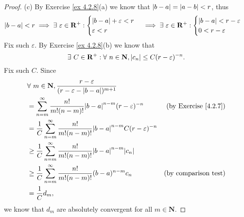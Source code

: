 \begin{proof}{(c)}
    By Exercise \ref{ex 4.2.8}(a) we know that \(\abs*{b - a} = \abs*{a - b} < r\), thus
    \[
        \abs*{b - a} < r \implies \exists\ \varepsilon \in \mathbf{R}^+ : \begin{cases}
            \abs*{b - a} + \varepsilon < r \\
            \varepsilon < r
        \end{cases} \implies \exists\ \varepsilon \in \mathbf{R}^+ : \begin{cases}
            \abs*{b - a} < r - \varepsilon \\
            0 < r - \varepsilon
        \end{cases}
    \]
    Fix such \(\varepsilon\).
    By Exercise \ref{ex 4.2.8}(b) we know that
    \[
        \exists\ C \in \mathbf{R}^+ : \forall\ n \in \mathbf{N}, \abs*{c_n} \leq C (r - \varepsilon)^{-n}.
    \]
    Fix such \(C\).
    Since
    \begin{align*}
         & \forall\ m \in \mathbf{N}, \frac{r - \varepsilon}{(r - \varepsilon - \abs*{b - a})^{m + 1}}                                               \\
         & = \sum_{n = m}^\infty \frac{n!}{m! (n - m)!} \abs*{b - a}^{n - m} (r - \varepsilon)^{-n}               & \text{(by Exercise \ref{4.2.7})} \\
         & = \frac{1}{C} \sum_{n = m}^\infty \frac{n!}{m! (n - m)!} \abs*{b - a}^{n - m} C (r - \varepsilon)^{-n}                                    \\
         & \geq \frac{1}{C} \sum_{n = m}^\infty \frac{n!}{m! (n - m)!} \abs*{b - a}^{n - m} \abs*{c_n}                                               \\
         & \geq \frac{1}{C} \sum_{n = m}^\infty \frac{n!}{m! (n - m)!} (b - a)^{n - m} c_n                        & \text{(by comparison test)}      \\
         & = \frac{1}{C} d_m,
    \end{align*}
    we know that \(d_m\) are absolutely convergent for all \(m \in \mathbf{N}\).
\end{proof}

